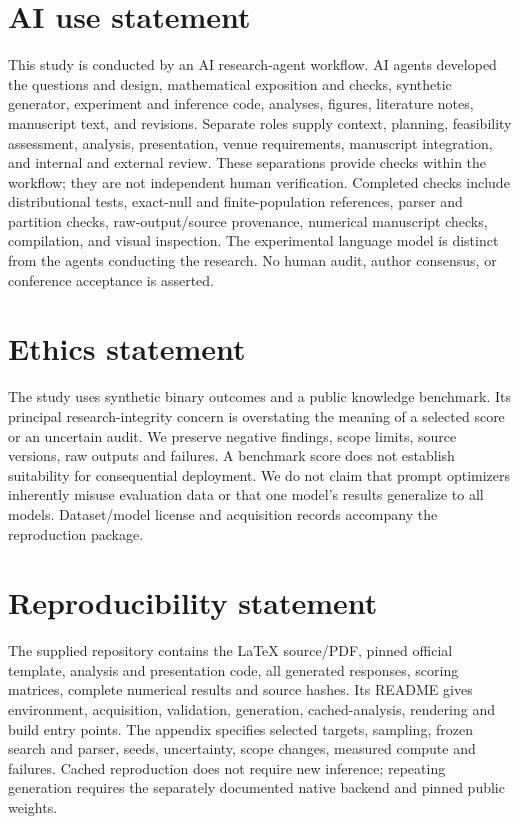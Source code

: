 \section*{AI use statement}
This study is conducted by an AI research-agent workflow. AI agents developed the questions and design, mathematical exposition and checks, synthetic generator, experiment and inference code, analyses, figures, literature notes, manuscript text, and revisions. Separate roles supply context, planning, feasibility assessment, analysis, presentation, venue requirements, manuscript integration, and internal and external review. These separations provide checks within the workflow; they are not independent human verification. Completed checks include distributional tests, exact-null and finite-population references, parser and partition checks, raw-output/source provenance, numerical manuscript checks, compilation, and visual inspection. The experimental language model is distinct from the agents conducting the research. No human audit, author consensus, or conference acceptance is asserted.

\section*{Ethics statement}
The study uses synthetic binary outcomes and a public knowledge benchmark. Its principal research-integrity concern is overstating the meaning of a selected score or an uncertain audit. We preserve negative findings, scope limits, source versions, raw outputs and failures. A benchmark score does not establish suitability for consequential deployment. We do not claim that prompt optimizers inherently misuse evaluation data or that one model's results generalize to all models. Dataset/model license and acquisition records accompany the reproduction package.

\section*{Reproducibility statement}
The supplied repository contains the LaTeX source/PDF, pinned official template, analysis and presentation code, all generated responses, scoring matrices, complete numerical results and source hashes. Its README gives environment, acquisition, validation, generation, cached-analysis, rendering and build entry points. The appendix specifies selected targets, sampling, frozen search and parser, seeds, uncertainty, scope changes, measured compute and failures. Cached reproduction does not require new inference; repeating generation requires the separately documented native backend and pinned public weights.
